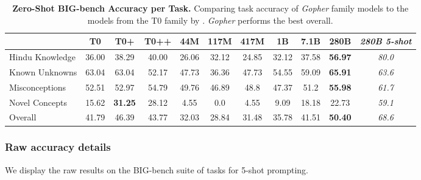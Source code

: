 \documentclass[11pt, a4paper, logo, internal, copyright, nonumbering]{deepmind}
\newcommand{\gopher}{\textit{Gopher}\xspace}
\newcommand{\bigbench}{BIG-bench\xspace}
\begin{document}
\begin{table}[ht]
\scriptsize
    \centering
\begin{tabular}{lccc|cccccc|c}
\toprule
&  \textbf{T0} &  \textbf{T0+} &  \textbf{T0++} &  \textbf{44M} & \textbf{117M} & \textbf{417M} & \textbf{1B} & \textbf{7.1B} & \textbf{280B} & \textit{280B 5-shot} \\ \midrule
Hindu Knowledge & 36.00 & 38.29 & 40.00 & 26.06 & 32.12 & 24.85 & 32.12 & 37.58 & \textbf{56.97} &  \textit{80.0} \\ 
Known Unknowns & 63.04 & 63.04 & 52.17 & 47.73 & 36.36 & 47.73 & 54.55 & 59.09 & \textbf{65.91} & \textit{63.6} \\ 
Misconceptions & 52.51 & 52.97 & 54.79 & 49.76 & 46.89 & 48.8 & 47.37 & 51.2 & \textbf{55.98} & \textit{61.7} \\ 
Novel Concepts & 15.62 & \textbf{31.25} & 28.12 & 4.55 & 0.0 & 4.55 & 9.09 & 18.18 & 22.73 & \textit{59.1} \\ 
\midrule
Overall &  41.79 &	46.39 &	43.77 &	32.03 &	28.84 &	31.48 &	35.78 &	41.51 &	\textbf{50.40} & \textit{68.6} \\ 
\bottomrule
    \end{tabular}
    \caption{\textbf{Zero-Shot \bigbench Accuracy per Task.} Comparing task accuracy of \gopher family models  to the models from the T0 family by \cite{sanh2021multitask}. \gopher performs the best overall.}
    \label{tab:bigbench_0shot_T0}
\end{table}
\subsubsection{Raw accuracy details}
We display the raw results on the \bigbench suite of tasks for 5-shot prompting.
\end{document}
